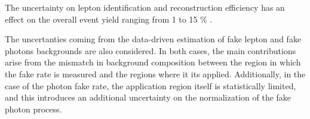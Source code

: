 The uncertainty on lepton identification and reconstruction efficiency has an effect on the overall event yield ranging from 1 to 15 \% .

The uncertanties coming from the data-driven estimation of fake lepton and fake photons backgrounds are also considered.
In both cases, the main contributions arise from the mismatch in background composition between the region in which the fake rate is measured and the regions where it its applied.
Additionally, in the case of the photon fake rate, the application region itself is statistically limited, and this introduces an additional uncertainty on the normalization of the fake photon process.
